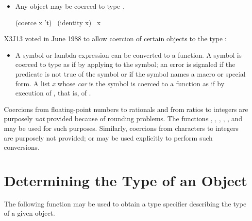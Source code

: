 \begin{defun}[Function]
\begin{itemize}
\item
Any object may be coerced to type .
\begin{lisp}
(coerce x 't) \EQ\ (identity x) \EQ\ x
\end{lisp}
\end{itemize}

\begin{newer}
X3J13 voted in June 1988 
to allow coercion of certain objects to the type :
\begin{itemize}
\item
A symbol or lambda-expression can be converted to a function.
A symbol is coerced to type  as if by applying
 to the symbol; an error is signaled if the predicate
 is not true of
the symbol or if the symbol names a macro or special form.
A list {\it x} whose {\it car} is the symbol 
is coerced to a function as if by execution of ,
that is, of .
\end{itemize}
\end{newer}

Coercions from floating-point numbers to rationals and from ratios
to integers are purposely {\it not} provided because of rounding
problems.  The functions , ,
, , , and  may be used for
such purposes.  Similarly, coercions from characters to integers
are purposely not provided;  or  may be
used explicitly to perform such conversions.
\end{defun}

\section{Determining the Type of an Object}

The following function may be used to obtain a type specifier
describing the type of a given object.

